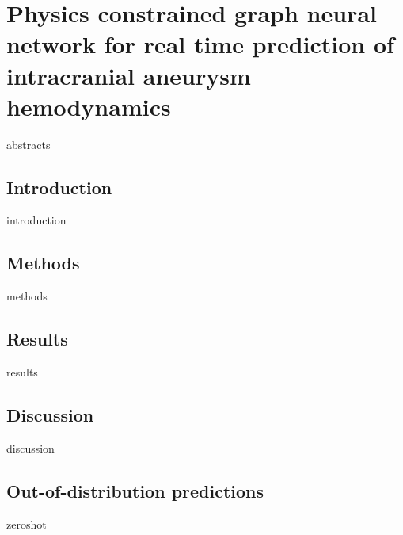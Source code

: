 \chapter{Physics constrained graph neural network for real time prediction of intracranial aneurysm hemodynamics}
\label{chapter:pcgnn}

{abstracts}

\section{Introduction}
{introduction}

\section{Methods} \label{sec:Methods}
{methods}

\section{Results}
{results}

\section{Discussion}
{discussion}

\section{Out-of-distribution predictions}
{zeroshot}

{\footnotesize\printbibliography[heading=chapbib, title={References}]}
